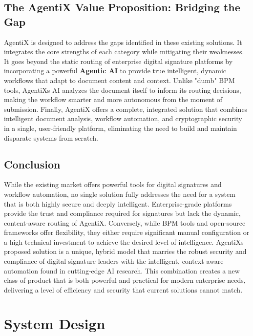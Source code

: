 \documentclass[12pt,oneside,openright,a4paper]{cpe-english-project}
\begin{document}
\section{The AgentiX Value Proposition: Bridging the Gap}

AgentiX is designed to address the gaps identified in these existing
solutions. It integrates the core strengths of each category while
mitigating their weaknesses. It goes beyond the static routing of
enterprise digital signature platforms by incorporating a powerful
\textbf{Agentic AI} to provide true intelligent, dynamic workflows that
adapt to document content and context. Unlike "dumb" BPM tools,
AgentiX\textquotesingle s AI analyzes the document itself to inform its
routing decisions, making the workflow smarter and more autonomous from
the moment of submission. Finally, AgentiX offers a complete, integrated
solution that combines intelligent document analysis, workflow
automation, and cryptographic security in a single, user-friendly
platform, eliminating the need to build and maintain disparate systems
from scratch.

\vspace{1em}

\section{Conclusion}

While the existing market offers powerful tools for digital signatures
and workflow automation, no single solution fully addresses the need for
a system that is both highly secure and deeply intelligent.
Enterprise-grade platforms provide the trust and compliance required for
signatures but lack the dynamic, content-aware routing of AgentiX.
Conversely, while BPM tools and open-source frameworks offer
flexibility, they either require significant manual configuration or a
high technical investment to achieve the desired level of intelligence.
AgentiX\textquotesingle s proposed solution is a unique, hybrid model
that marries the robust security and compliance of digital signature
leaders with the intelligent, context-aware automation found in
cutting-edge AI research. This combination creates a new class of
product that is both powerful and practical for modern enterprise needs,
delivering a level of efficiency and security that current solutions
cannot match.

\newpage

\chapter{System Design}
\end{document}
